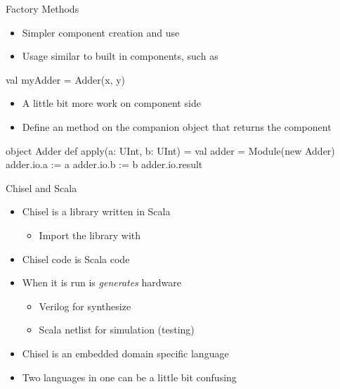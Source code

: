 \begin{frame}[fragile]{Factory Methods}
\begin{itemize}
\item Simpler component creation and use
\item Usage similar to built in components, such as 
\end{itemize}
\begin{chisel}
val myAdder = Adder(x, y)
\end{chisel}
\begin{itemize}
\item A little bit more work on component side
\item Define an  method on the companion object that returns the component
\end{itemize}
\begin{chisel}
object Adder {
  def apply(a: UInt, b: UInt) = {
    val adder = Module(new Adder)
    adder.io.a := a
    adder.io.b := b
    adder.io.result
  }
}
\end{chisel}
\end{frame}

\begin{frame}[fragile]{Chisel and Scala}
\begin{itemize}
\item Chisel is a library written in Scala
\begin{itemize}
\item Import the library with 
\end{itemize}
\item Chisel code is Scala code
\item When it is run is \emph{generates} hardware
\begin{itemize}
\item Verilog for synthesize
\item Scala netlist for simulation (testing)
\end{itemize}
\item Chisel is an embedded domain specific language
\item Two languages in one can be a little bit confusing
\end{itemize}
\end{frame}

